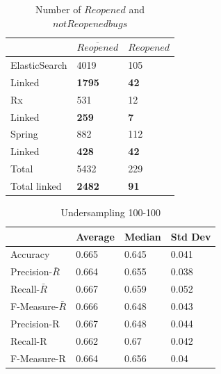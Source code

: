 \documentclass[sigconf,review]{acmart}
\begin{document}
\begin{table} [h]
\caption{Number of $Reopened$ and $ not Reopened bugs$} \label{tab:linked}
\begin{tabular}{lll}
\hline
\hline
\multicolumn{1}{c}{}
& \multicolumn{1}{c}{$\overline{Reopened}$} 
& \multicolumn{1}{c}{$ Reopened$}    \\    

\hline
ElasticSearch      & 4019 & 105     \\
Linked        &\textbf{1795} &\textbf{42}\\ 
\hline
Rx            & 531 & 12     \\
Linked        &\textbf{259} &\textbf{7}\\
\hline
Spring          & 882 & 112     \\
Linked        &\textbf{428} &\textbf{42}\\
\hline
\hline
Total       & 5432 & 229 \\
Total linked    & \textbf{2482} & \textbf{91} \\
\hline
\hline
\end{tabular}
\end{table}
 
 \newpage

\begin{table}[h]
  \caption{Undersampling 100-100} \label{table:undersampling100}

    \begin{tabular}{llll}
    \hline
    \hline
    \multicolumn{1}{c}{}
    & \multicolumn{1}{c}{Average}
    & \multicolumn{1}{c}{Median}        
    &   \multicolumn{1}{c}{Std Dev}\\
    \hline
    Accuracy      & 0.665 & 0.645 & 0.041     \\
    \hline
    Precision-$\bar{R}$  &0.664   &0.655  & 0.038       \\
    Recall-$\bar{R}$  &0.667  &0.659  &0.052\\
    F-Measure-$\bar{R}$    & 0.666  &0.648  &0.043      \\
    \hline
    Precision-R          & 0.667  &0.648  &0.044 \\
    Recall-R & 0.662 & 0.67 &0.042 \\
    F-Measure-R    & 0.664  &0.656  &0.04\\
    \hline
    \hline
    \end{tabular}

  \end{table}
  
\end{document}
